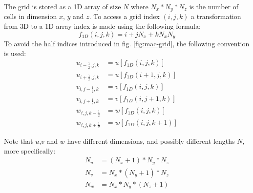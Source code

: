 The grid is stored as a 1D array of size \begin{math}N\end{math} where \begin{math}N_x*N_y*N_z\end{math} is the number of cells in dimension \begin{math}x\end{math}, \begin{math}y\end{math} and \begin{math}z\end{math}. To access a grid index \begin{math}(i,j,k)\end{math} a transformation from 3D to a 1D array index is made using the following formula:
 \begin{equation} 
 f_{1D}(i,j,k) = i + jN_x + kN_xN_y 
 \end{equation}
To avoid the half indices introduced in fig. \ref{fig:mac-grid}, the following convention is used:  
\begin{align*}
 u_{i-\frac{1}{2},j,k} & =  u[f_{1D}(i,j,k)] 			\\
 u_{i+\frac{1}{2},j,k} & =  u[f_{1D}(i+1,j,k)] 			\\
 v_{i,j-\frac{1}{2},k} & =  v[f_{1D}(i,j,k)] 			\\
 v_{i,j+\frac{1}{2},k} & =  v[f_{1D}(i,j+1,k)] 			\\
 w_{i,j,k-\frac{1}{2}} & =  w[f_{1D}(i,j,k)] 			\\
 w_{i,j,k+\frac{1}{2}} & =  w[f_{1D}(i,j,k+1)] 		
 \end{align*}

Note that $u$,$v$ and $w$ have different dimensions, and possibly different lengths $N$, more specifically:
 \begin{align*}
N_u & = (N_x+1)*N_y*N_z			\\
N_v & = N_x*(N_y+1)*N_z			\\
N_w & = N_x*N_y*(N_z+1)				
 \end{align*}